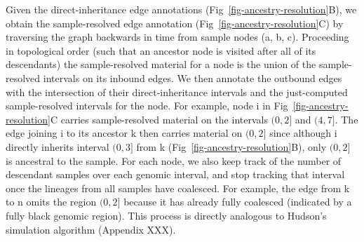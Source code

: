 \documentclass{article}
\begin{document}


Given the direct-inheritance edge annotations
(Fig~\ref{fig-ancestry-resolution}B),
 we obtain the sample-resolved edge annotation
(Fig~\ref{fig-ancestry-resolution}C) by traversing the graph backwards in time
from sample nodes (\textsf{a}, \textsf{b}, \textsf{c}).
Proceeding in topological order (such that an ancestor node is visited
after all of its descendants) the sample-resolved material for a node is the
union of the sample-resolved intervals on its inbound edges. We then annotate
the outbound edges with the intersection of their direct-inheritance intervals
and the just-computed sample-resolved intervals for the node.
For example, node \textsf{i} in Fig~\ref{fig-ancestry-resolution}C
carries sample-resolved material on the intervals $(0, 2]$ and $(4, 7]$. The edge
joining \textsf{i} to its ancestor \textsf{k} then carries
material on $(0, 2]$ since although \textsf{i} directly inherits interval
$(0, 3]$ from \textsf{k} (Fig~\ref{fig-ancestry-resolution}B), only $(0, 2]$ is
ancestral to the sample. For each node, we also keep track of the number of
descendant samples over each genomic interval, and stop tracking that
interval once the lineages from all samples have coalesced. For example,
the edge from \textsf{k} to \textsf{n} omits the region $(0,2]$ because it has
already fully coalesced (indicated by a fully black genomic region).
This process is directly analogous to Hudson's simulation algorithm
(Appendix XXX).
\end{document}
